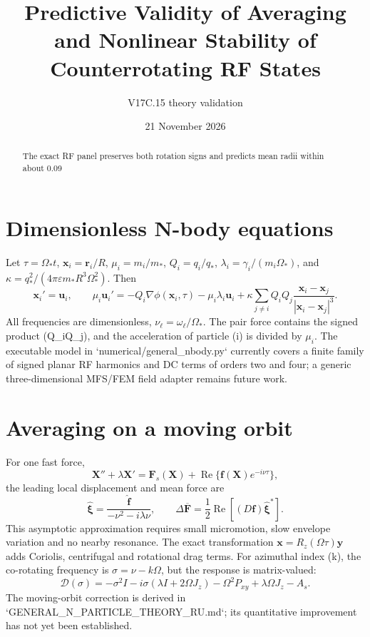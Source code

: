 \documentclass[11pt,a4paper]{article}
\title{Predictive Validity of Averaging and Nonlinear Stability of Counterrotating RF States}
\author{V17C.15 theory validation}
\date{21 November 2026}
\begin{document}
\maketitle

\begin{abstract}
The exact RF panel preserves both rotation signs and predicts mean radii within about 0.09%
\end{abstract}

\section{Dimensionless N-body equations}
Let \(\tau=\Omega_*t\), \(\mathbf x_i=\mathbf r_i/R\), \(\mu_i=m_i/m_*\), \(Q_i=q_i/q_*\), \(\lambda_i=\gamma_i/(m_i\Omega_*)\), and \(\kappa=q_*^2/(4\pi\varepsilon m_*R^3\Omega_*^2)\). Then
\begin{equation}
\mathbf x_i'=\mathbf u_i,\qquad
\mu_i\mathbf u_i'=-Q_i\nabla\phi(\mathbf x_i,\tau)-\mu_i\lambda_i\mathbf u_i
+\kappa\sum_{j\ne i}Q_iQ_j\frac{\mathbf x_i-\mathbf x_j}{|\mathbf x_i-\mathbf x_j|^3}.
\label{eq:nbody}
\end{equation}
All frequencies are dimensionless, \(\nu_\ell=\omega_\ell/\Omega_*\). The pair force contains the signed product (Q_iQ_j), and the acceleration of particle (i) is divided by \(\mu_i\). The executable model in `numerical/general_nbody.py` currently covers a finite family of signed planar RF harmonics and DC terms of orders two and four; a generic three-dimensional MFS/FEM field adapter remains future work.

\section{Averaging on a moving orbit}
For one fast force,
\[
\mathbf X''+\lambda\mathbf X'=\mathbf F_s(\mathbf X)+\operatorname{Re}\{\mathbf f(\mathbf X)e^{-i\nu\tau}\},
\]
the leading local displacement and mean force are
\[
\widehat{\boldsymbol\xi}=\frac{\widehat{\mathbf f}}{-\nu^2-i\lambda\nu},\qquad
\Delta\overline{\mathbf F}=\frac12\operatorname{Re}[(D\mathbf f)\widehat{\boldsymbol\xi}^{*}].
\]
This asymptotic approximation requires small micromotion, slow envelope variation and no nearby resonance. The exact transformation \(\mathbf x=R_z(\Omega\tau)\mathbf y\) adds Coriolis, centrifugal and rotational drag terms. For azimuthal index (k), the co-rotating frequency is \(\sigma=\nu-k\Omega\), but the response is matrix-valued:
\[
\mathcal D(\sigma)=-\sigma^2I-i\sigma(\lambda I+2\Omega J_z)
-\Omega^2P_{xy}+\lambda\Omega J_z-A_s.
\]
The moving-orbit correction is derived in `GENERAL_N_PARTICLE_THEORY_RU.md`; its quantitative improvement has not yet been established.
\end{document}
